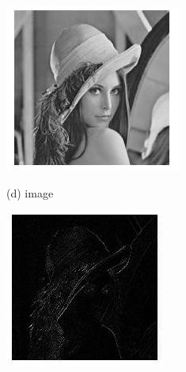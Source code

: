 \documentclass[10pt]{article}
\begin{document}
\includegraphics[max width=\textwidth]{2022_01_06_b5ce182ed1bd5f482e5bg-11}

(d) image

\includegraphics[max width=\textwidth]{2022_01_06_b5ce182ed1bd5f482e5bg-11(1)}
\end{document}

